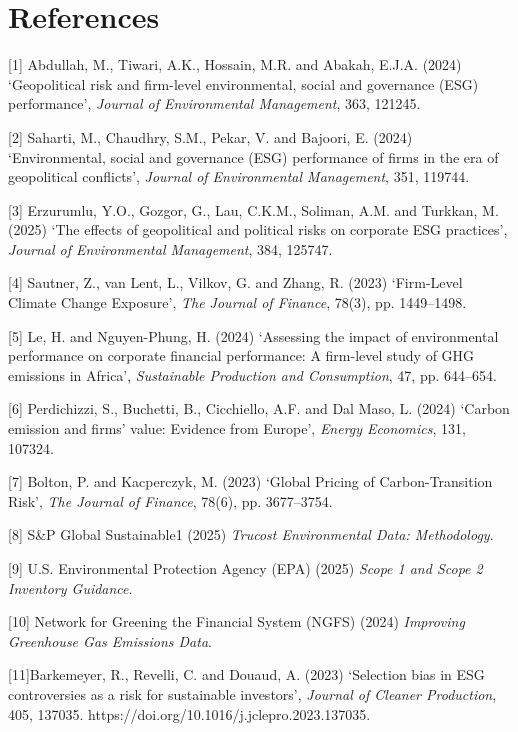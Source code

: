 \documentclass[12pt,a4paper]{article}
\begin{document}
\newpage

%

\section{References}

[1] Abdullah, M., Tiwari, A.K., Hossain, M.R. and Abakah, E.J.A. (2024) ‘Geopolitical risk and firm-level environmental, social and governance (ESG) performance’, \textit{Journal of Environmental Management}, 363, 121245. 

[2] Saharti, M., Chaudhry, S.M., Pekar, V. and Bajoori, E. (2024) ‘Environmental, social and governance (ESG) performance of firms in the era of geopolitical conflicts’, \textit{Journal of Environmental Management}, 351, 119744. 

[3] Erzurumlu, Y.O., Gozgor, G., Lau, C.K.M., Soliman, A.M. and Turkkan, M. (2025) ‘The effects of geopolitical and political risks on corporate ESG practices’, \textit{Journal of Environmental Management}, 384, 125747. 

[4] Sautner, Z., van Lent, L., Vilkov, G. and Zhang, R. (2023) ‘Firm-Level Climate Change Exposure’, \textit{The Journal of Finance}, 78(3), pp. 1449–1498. 

[5] Le, H. and Nguyen-Phung, H. (2024) ‘Assessing the impact of environmental performance on corporate financial performance: A firm-level study of GHG emissions in Africa’, \textit{Sustainable Production and Consumption}, 47, pp. 644–654. 

[6] Perdichizzi, S., Buchetti, B., Cicchiello, A.F. and Dal Maso, L. (2024) ‘Carbon emission and firms’ value: Evidence from Europe’, \textit{Energy Economics}, 131, 107324. 

[7] Bolton, P. and Kacperczyk, M. (2023) ‘Global Pricing of Carbon-Transition Risk’, \textit{The Journal of Finance}, 78(6), pp. 3677–3754.

[8] S\&P Global Sustainable1 (2025) \textit{Trucost Environmental Data: Methodology}.

[9] U.S. Environmental Protection Agency (EPA) (2025) \textit{Scope 1 and Scope 2 Inventory Guidance}.

[10] Network for Greening the Financial System (NGFS) (2024) \textit{Improving Greenhouse Gas Emissions Data}.

[11]Barkemeyer, R., Revelli, C. and Douaud, A. (2023) ‘Selection bias in ESG controversies as a risk for sustainable investors’, \textit{Journal of Cleaner Production}, 405, 137035. https://doi.org/10.1016/j.jclepro.2023.137035. 
\end{document}
